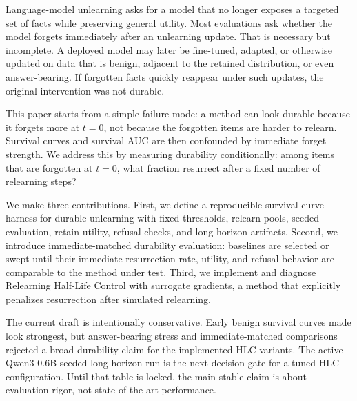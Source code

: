 Language-model unlearning asks for a model that no longer exposes a targeted set of facts while preserving general utility.
Most evaluations ask whether the model forgets immediately after an unlearning update.
That is necessary but incomplete.
A deployed model may later be fine-tuned, adapted, or otherwise updated on data that is benign, adjacent to the retained distribution, or even answer-bearing.
If forgotten facts quickly reappear under such updates, the original intervention was not durable.

This paper starts from a simple failure mode: a method can look durable because it forgets more at $t=0$, not because the forgotten items are harder to relearn.
Survival curves and survival AUC are then confounded by immediate forget strength.
We address this by measuring durability conditionally: among items that are forgotten at $t=0$, what fraction resurrect after a fixed number of relearning steps?

We make three contributions.
First, we define a reproducible survival-curve harness for durable unlearning with fixed thresholds, relearn pools, seeded evaluation, retain utility, refusal checks, and long-horizon artifacts.
Second, we introduce immediate-matched durability evaluation: baselines are selected or swept until their immediate resurrection rate, utility, and refusal behavior are comparable to the method under test.
Third, we implement and diagnose Relearning Half-Life Control with surrogate gradients, a method that explicitly penalizes resurrection after simulated relearning.

The current draft is intentionally conservative.
Early benign survival curves made \method{} look strongest, but answer-bearing stress and immediate-matched comparisons rejected a broad durability claim for the implemented HLC variants.
The active Qwen3-0.6B seeded long-horizon run is the next decision gate for a tuned HLC configuration.
Until that table is locked, the main stable claim is about evaluation rigor, not state-of-the-art performance.
